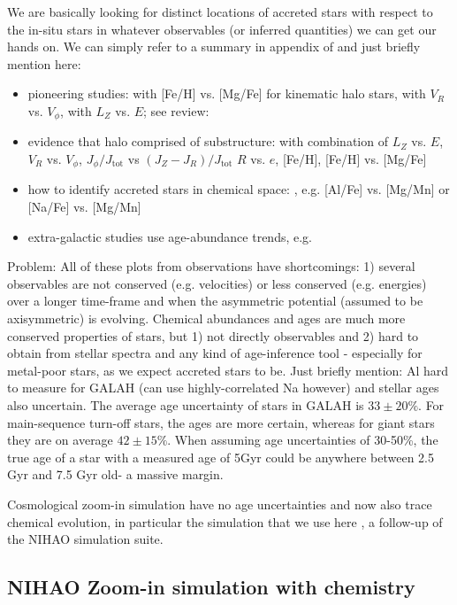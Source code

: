 \documentclass[fleqn,usenatbib]{mnras}
\begin{document}
We are basically looking for distinct locations of accreted stars with respect to the in-situ stars in whatever observables (or inferred quantities) we can get our hands on. We can simply refer to a summary in appendix of \citet{Buder2022} and just briefly mention here:
\begin{itemize}
    \item pioneering studies: \citet{Nissen2010} with [Fe/H] vs. [Mg/Fe] for kinematic halo stars, \citet{Belokurov2018} with $V_R$ vs. $V_\phi$, \citet{Helmi2018} with $L_Z$ vs. $E$; see review: \citet{Helmi2020}
    \item evidence that halo comprised of substructure: \citet{Naidu2020} with combination of $L_Z$ vs. $E$, $V_R$ vs. $V_\phi$, $J_\phi/J_\text{tot}$ vs $(J_Z - J_R)/J_\text{tot}$ $R$ vs. $e$, [Fe/H], [Fe/H] vs. [Mg/Fe]
    \item how to identify accreted stars in chemical space: \citet{Hawkins2015, Das2020, Buder2022}, e.g. [Al/Fe] vs. [Mg/Mn] or [Na/Fe] vs. [Mg/Mn]
    \item extra-galactic studies use age-abundance trends, e.g. \citet{Martig2021}
\end{itemize}

Problem: All of these plots from observations have shortcomings: 1) several observables are not conserved (e.g. velocities) or less conserved (e.g. energies) over a longer time-frame and when the asymmetric potential (assumed to be axisymmetric) is evolving. Chemical abundances and ages are much more conserved properties of stars, but 1) not directly observables and 2) hard to obtain from stellar spectra and any kind of age-inference tool - especially for metal-poor stars, as we expect accreted stars to be. Just briefly mention: Al hard to measure for GALAH (can use highly-correlated Na however) and stellar ages also uncertain. The average age uncertainty of stars in GALAH is $33 \pm 20\%$. For main-sequence turn-off stars, the ages are more certain, whereas for giant stars they are on average $42 \pm 15\%$. When assuming age uncertainties of 30-50\%, the true age of a star with a measured age of 5Gyr could be anywhere between 2.5 Gyr and 7.5 Gyr old- a massive margin.

Cosmological zoom-in simulation have no age uncertainties and now also trace chemical evolution, in particular the simulation that we use here \citep{Buck2021}, a follow-up of the NIHAO simulation suite.

\subsection{NIHAO Zoom-in simulation with chemistry}
\end{document}
